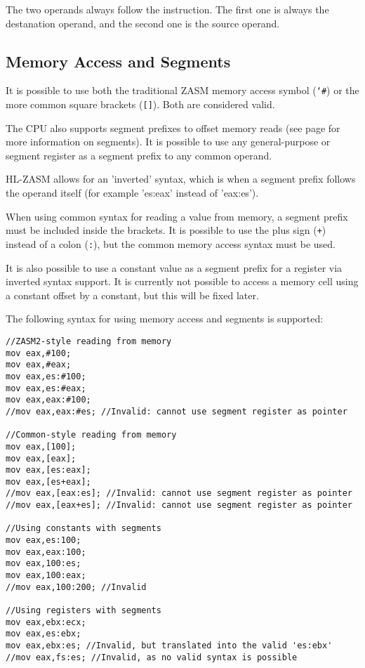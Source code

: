 The two operands always follow the instruction. The first one is always the destanation operand, and the second one is the source operand.

\subsection{Memory Access and Segments}
It is possible to use both the traditional ZASM memory access symbol (\texttt{\char`\#}) or the more common square brackets (\texttt{[]}). Both are considered valid.

The CPU also supports segment prefixes to offset memory reads (see page \pageref{segments} for more information on segments). It is possible to use any general-purpose or segment register as a segment prefix to any common operand.

HL-ZASM allows for an 'inverted' syntax, which is when a segment prefix follows the operand itself (for example 'es:eax' instead of 'eax:es').

When using common syntax for reading a value from memory, a segment prefix must be included inside the brackets. It is possible to use the plus sign (\texttt{+}) instead of a colon (\texttt{:}), but the common memory access syntax must be used.

It is also possible to use a constant value as a segment prefix for a register via inverted syntax support. It is currently not possible to access a memory cell using a constant offset by a constant, but this will be fixed later.

The following syntax for using memory access and segments is supported:
\begin{verbatim}
//ZASM2-style reading from memory
mov eax,#100;
mov eax,#eax;
mov eax,es:#100;
mov eax,es:#eax;
mov eax,eax:#100;
//mov eax,eax:#es; //Invalid: cannot use segment register as pointer

//Common-style reading from memory
mov eax,[100];
mov eax,[eax];
mov eax,[es:eax];
mov eax,[es+eax];
//mov eax,[eax:es]; //Invalid: cannot use segment register as pointer
//mov eax,[eax+es]; //Invalid: cannot use segment register as pointer

//Using constants with segments
mov eax,es:100;
mov eax,eax:100;
mov eax,100:es;
mov eax,100:eax;
//mov eax,100:200; //Invalid

//Using registers with segments
mov eax,ebx:ecx;
mov eax,es:ebx;
mov eax,ebx:es; //Invalid, but translated into the valid 'es:ebx'
//mov eax,fs:es; //Invalid, as no valid syntax is possible
\end{verbatim}


